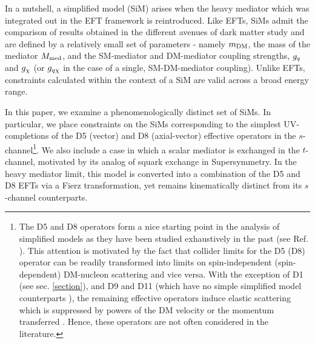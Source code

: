 In a nutshell, a simplified model (SiM) arises when the heavy mediator which was integrated out in the EFT framework is reintroduced. Like EFTs, SiMs admit the comparison of results obtained in the different avenues of dark matter study \cite{} and are defined by a relatively small set of parameters - namely $m_{\mathrm{DM}}$, the mass of the mediator $M_{\mathrm{med}}$, and the SM-mediator and DM-mediator coupling strengths, $g_q$ and $g_{\chi}$ (or $g_{q \chi}$ in the case of a single, SM-DM-mediator coupling). Unlike EFTs, constraints calculated within the context of a SiM are valid across a broad energy range.

In this paper, we examine a phenomenologically distinct set of SiMs. In particular, we place constraints on the SiMs corresponding to the simplest UV-completions of the D5 (vector) and D8 (axial-vector) effective operators in the $s$-channel\footnote{The D5 and D8 operators form a nice starting point in the analysis of simplified models as they have been studied exhaustively in the past (see Ref. \cite{}). This attention is motivated by the fact that collider limits for the D5 (D8) operator can be readily transformed into limits on spin-independent (spin-dependent) DM-nucleon scattering and vice versa. With the exception of D1 (see sec. \ref{section}), and D9 and D11 (which have no simple simplified model counterparts \cite{}), the remaining effective operators induce elastic scattering which is suppressed by powers of the DM velocity or the momentum transferred \cite{Kumar}. Hence, these operators are not often considered in the literature.}. We also include a case in which a scalar mediator is exchanged in the $t$-channel, motivated by its analog of squark exchange in Supersymmetry. In the heavy mediator limit, this model is converted into a combination of the D5 and D8 EFTs via a Fierz transformation, yet remains kinematically distinct from its $s$-channel counterparts.

